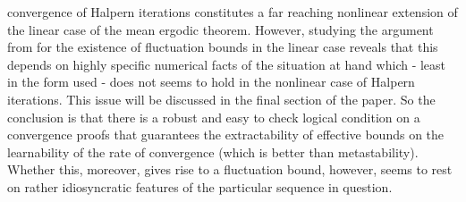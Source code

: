 convergence of Halpern iterations constitutes 
a far reaching nonlinear extension 
of the linear case of the mean ergodic theorem.
However, 
studying the argument from \cite{Avigad/Rute} for the existence of 
fluctuation bounds in the linear case reveals that this depends on 
highly specific numerical facts of the situation at hand which - least 
in the form used - does not seems to hold in the nonlinear case of 
Halpern iterations. This issue will be discussed in the final section 
of the paper. So the conclusion is that there is a robust and easy to check 
logical condition on a convergence proofs that guarantees the extractability 
of effective bounds on the learnability of the rate of convergence (which 
is better than metastability). Whether this, moreover, gives rise to a 
fluctuation bound, however, seems to rest on rather idiosyncratic features 
of the particular sequence in question.
